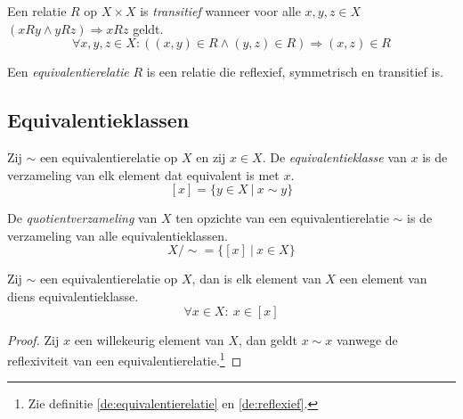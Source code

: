 \documentclass[main.tex]{subfiles}
\begin{document}
\begin{de}
  \label{de:transitief}
  Een relatie $R$ op $X \times X$ is \emph{transitief} wanneer voor alle $x,y,z\in X$ $(xRy \wedge yRz) \Rightarrow xRz$ geldt.
  \[ \forall x,y,z \in X: ((x,y) \in R \wedge (y,z) \in R) \Rightarrow (x,z) \in R\]
\end{de}

\begin{de}
  \label{de:equivalentierelatie}
  Een \emph{equivalentierelatie} $R$ is een relatie die reflexief, symmetrisch en transitief is.
\end{de}

\subsection{Equivalentieklassen}
\label{sec:equivalentieklassen}

\begin{de}
  Zij $\sim$ een equivalentierelatie op $X$ en zij $x \in X$.
  De \emph{equivalentieklasse} van $x$ is de verzameling van elk element dat equivalent is met $x$.
  \[ [x] = \{ y \in X\ |\ x \sim y \} \]
\end{de}

\begin{de}
  De \emph{quotientverzameling} van $X$ ten opzichte van een equivalentierelatie $\sim$ is de verzameling van alle equivalentieklassen.
  \[ X/\sim = \{[x] \ |\ x \in X \}\]
\end{de}

\begin{st}
  \label{st:element-in-equivalentieklasse}
  Zij $\sim$ een equivalentierelatie op $X$, dan is elk element van $X$ een element van diens equivalentieklasse.
  \[ \forall x \in X:\ x \in [x] \]
  
  \begin{proof}
    Zij $x$ een willekeurig element van $X$, dan geldt $x \sim x$ vanwege de reflexiviteit van een equivalentierelatie.\footnote{Zie definitie \ref{de:equivalentierelatie} en \ref{de:reflexief}.}
  \end{proof}
\end{st}
\end{document}
